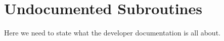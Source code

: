 \chapter{Undocumented Subroutines}

Here we need to state what the developer documentation is all about.
